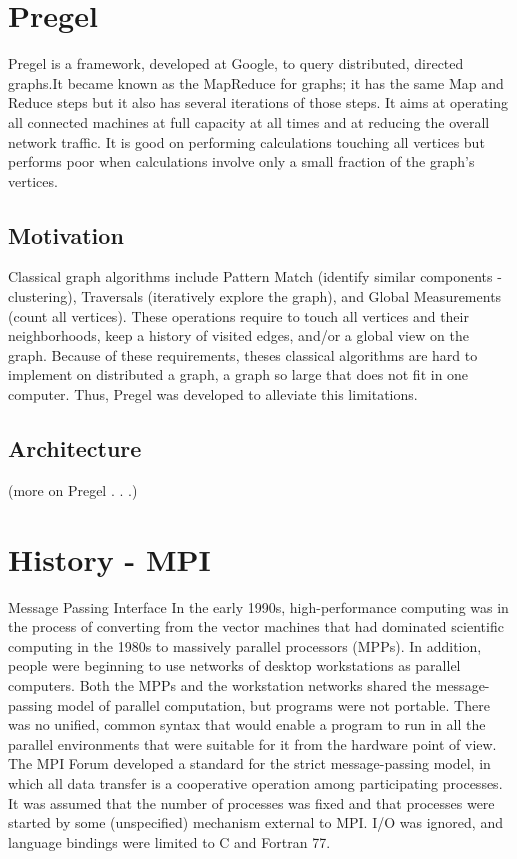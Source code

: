 \documentclass[letterpaper,twocolumn,10pt]{article}
\begin{document}
\section{Pregel}
Pregel is a framework, developed at Google, to query  distributed, directed graphs.It became known as the MapReduce for graphs; it has the same Map and Reduce steps but it also has several iterations of those steps.
It aims at operating all connected machines at full capacity at all times and at reducing the overall network traffic. It is good on performing calculations touching all vertices but performs poor when calculations involve only a small fraction of the graph's vertices.
\subsection{Motivation}
Classical graph algorithms include Pattern Match (identify similar components - clustering), Traversals (iteratively explore the graph), and Global Measurements (count all vertices). These operations require to touch all vertices and their neighborhoods, keep a history of visited edges, and/or a global view on the graph.
Because of these requirements, theses classical algorithms are hard to implement on distributed a graph, a graph so large that does not fit in one computer. Thus, Pregel was developed to alleviate this limitations.
\subsection{Architecture}
(more on Pregel . . .)



\section{History - MPI}
Message Passing Interface
In the early 1990s, high-performance computing was in the process of converting from the vector machines that had dominated scientific computing in the 1980s to massively parallel processors (MPPs).
In addition, people were beginning to use networks of desktop workstations as parallel computers. Both the MPPs and the workstation networks shared the message-passing model of parallel computation, but programs were not portable.
There was no unified, common syntax that would enable a program to run in all the parallel environments that were suitable for it from the hardware point of view.
The MPI Forum developed a standard for the strict message-passing model, in which all data transfer is a cooperative operation among participating processes. It was assumed that the number of processes was fixed and that processes were started by some (unspecified) mechanism external to MPI.
I/O was ignored, and language bindings were limited to C and Fortran 77.
\end{document}
